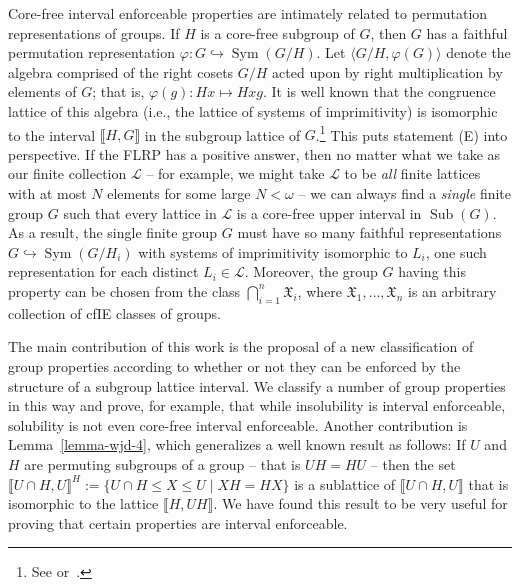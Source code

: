 \documentclass{gen-j-l}
\newcommand{\lb}{\ensuremath{\llbracket}}
\newcommand{\rb}{\ensuremath{\rrbracket}}
\newcommand{\<}{\ensuremath{\langle}}
\renewcommand{\>}{\ensuremath{\rangle}}
\theoremstyle{plain}
\theoremstyle{definition}
\theoremstyle{remark}
\numberwithin{theorem}{section}
\numberwithin{claim}{section}
\numberwithin{equation}{section}
\numberwithin{conjecture}{section}
\renewcommand{\leq}{\ensuremath{\leqslant}}
\newcommand{\Con}{\ensuremath{\operatorname{Con}}}
\newcommand{\Sub}{\ensuremath{\operatorname{Sub}}}
\newcommand{\Sym}{\ensuremath{\operatorname{Sym}}}
\newcommand{\2}{\ensuremath{\mathbf{2}}}
\newcommand{\3}{\ensuremath{\mathbf{3}}}
\newcommand{\sG}{\ensuremath{\mathfrak{X}}}
\newcommand{\sL}{\ensuremath{\mathscr{L}}}
\renewcommand{\phi}{\ensuremath{\varphi}}
\begin{document}
Core-free interval enforceable properties are intimately related to permutation
representations of groups.   
If $H$ is a core-free subgroup of $G$, then $G$ has a faithful permutation 
representation $\phi:G\hookrightarrow \Sym(G/H)$.
Let $\<G/H, \phi(G)\>$ denote the algebra comprised of the right cosets
$G/H$ acted upon by right multiplication by elements of $G$; that is,
$\phi(g): Hx \mapsto Hxg$.  It is
well known that the congruence lattice of this algebra (i.e., the lattice of
systems of imprimitivity) %
 is isomorphic to the interval $\lb H, G \rb$ in the subgroup
lattice of $G$.\footnote{See \cite[Lemma 4.20]{alvi:1987}
or~\cite[Theorem 1.5A]{Dixon:1996}.}
This puts statement (E) into perspective.
If the \acs{FLRP} has a positive answer, then no matter 
what we take as our finite collection $\sL$ -- for example, we
might take $\sL$ to be \emph{all} finite lattices with
at most $N$ elements for some large $N< \omega$ -- we can always find a \emph{single}
finite group $G$ such that every lattice in $\sL$ is a core-free upper interval in
$\Sub(G)$.
As a result, the single finite group $G$ must have so many faithful
representations  $G\hookrightarrow \Sym(G/H_i)$ with systems of imprimitivity
isomorphic to $L_i$,
one such
representation for each distinct $L_i\in \sL$.  Moreover, the group $G$ having
this property can be chosen from the class $\bigcap\limits_{i=1}^n \sG_i$, where 
$\sG_1, \dots, \sG_n$ is an arbitrary collection of \acs{cfIE} classes of groups.

The main contribution of this work is the proposal of a new classification
of group properties according to whether or not they can be enforced by the
structure of a subgroup lattice interval.  We classify a number of group
properties in this way and prove, for example, that while insolubility is interval
enforceable, solubility is not even core-free interval enforceable.  Another
contribution is Lemma~\ref{lemma-wjd-4}, which generalizes a well known result
as follows:
If $U$ and $H$ are permuting subgroups of a group -- that is $UH = HU$ -- then
the set $\lb U\cap H, U \rb^H :=\{U\cap H \leq X\leq U \mid XH = HX\}$ 
is a sublattice of $\lb U\cap H, U \rb$ that is isomorphic to the lattice $\lb H, UH \rb$.
We have found this result to be very useful
for proving that certain properties are interval enforceable.
\end{document}

